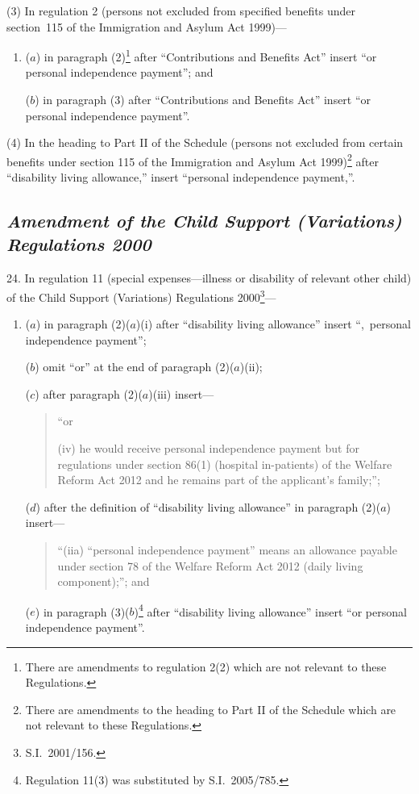 \documentclass[12pt,a4paper]{article}
\begin{document}
(3) In regulation 2 (persons not excluded from specified benefits under section~115 of the Immigration and Asylum Act 1999)—
\begin{enumerate}\item[]
($a$) in paragraph (2)\footnote{There are amendments to regulation 2(2) which are not relevant to these Regulations.} after “Contributions and Benefits Act” insert “or personal independence payment”; and

($b$) in paragraph (3) after “Contributions and Benefits Act” insert “or personal independence payment”.
\end{enumerate}

(4) In the heading to Part II of the Schedule (persons not excluded from certain benefits under section 115 of the Immigration and Asylum Act 1999)\footnote{There are amendments to the heading to Part II of the Schedule which are not relevant to these Regulations.} after “disability living allowance,” insert “personal independence payment,”.

\subsection*{\itshape Amendment of the Child Support (Variations) Regulations 2000}

24.  In regulation 11 (special expenses---illness or disability of relevant other child) of the Child Support (Variations) Regulations 2000\footnote{S.I.~2001/156.}—
\begin{enumerate}\item[]
($a$) in paragraph (2)($a$)(i)  after “disability living allowance” insert “,~personal independence payment”;

($b$) omit “or” at the end of paragraph (2)($a$)(ii);

($c$) after paragraph (2)($a$)(iii)  insert—
\begin{quotation}
“or

(iv) he would receive personal independence payment but for regulations under section 86(1) (hospital in-patients) of the Welfare Reform Act 2012 and he remains part of the applicant’s family;”;
\end{quotation}

($d$) after the definition of “disability living allowance” in paragraph (2)($a$)  insert—
\begin{quotation}
“(iia) “personal independence payment” means an allowance payable under section 78 of the Welfare Reform Act 2012 (daily living component);”; and
\end{quotation}

($e$) in paragraph (3)($b$)\footnote{Regulation 11(3) was substituted by S.I.~2005/785.} after “disability living allowance” insert “or personal independence payment”.
\end{enumerate}
\end{document}
